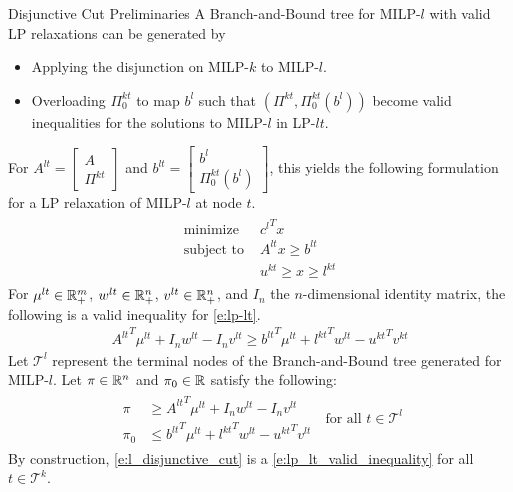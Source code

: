 \documentclass[final]{beamer}
\newlength{\colwidth}
\begin{document}
\begin{frame}[t]
\begin{columns}[t]
\begin{column}{\colwidth}
\begin{block}{Disjunctive Cut Preliminaries}
	A Branch-and-Bound tree for MILP-$ l $ with valid LP relaxations can be generated by
	\begin{itemize}
		\item Applying the disjunction on MILP-$ k $ to MILP-$ l $.
		\item Overloading $ \Pi_0^{kt} $ to map $ b^l $ such that $ (\Pi^{kt}, \Pi_0^{kt}(b^l)) $ become valid inequalities for the solutions to MILP-$ l $ in LP-$ lt $.
	\end{itemize}
	For $ A^{lt} = \begin{bmatrix} A \\ \Pi^{kt} \end{bmatrix} $ and $ b^{lt} = \begin{bmatrix} b^l \\ \Pi_0^{kt}(b^l) \end{bmatrix} $, this yields the following formulation for a LP relaxation of MILP-$ l $ at node $ t $.
	\begin{align}
		\begin{split}
			\text{minimize } & {c^l}^T x \\
			\text{subject to } & A^{lt}x \geq b^{lt} \\
			& u^{kt} \geq x \geq l^{kt}
		\end{split} \label{e:lp-lt} \tag{LP-$ lt $}
	\end{align}
	For $ \mu^{lt} \in \mathbb{R}_+^{m}$, $ w^{lt} \in \mathbb{R}_+^{n}$, $ v^{lt} \in \mathbb{R}_+^{n} $, and $ I_n $ the $ n $-dimensional identity matrix, the following is a valid inequality for \ref{e:lp-lt}.
	\begin{align}
		{A^{lt}}^T \mu^{lt} + I_n w^{lt} - I_n v^{lt} \geq {b^{lt}}^T \mu^{lt} + {l^{kt}}^T w^{lt} - {u^{kt}}^T v^{kt} \label{e:lp_lt_valid_inequality} \tag{LP-$ lt $ valid inequality}
	\end{align}
	Let $ \mathcal{T}^l $ represent the terminal nodes of the Branch-and-Bound tree generated for MILP-$ l $. Let $ \pi \in \mathbb{R}^n $ and $ \pi_0 \in \mathbb{R} $ satisfy the following:
	\begin{align}
		\begin{split}
			\pi &\geq {A^{lt}}^T \mu^{lt} + I_n w^{lt} - I_n v^{lt} \\
			\pi_0 & \leq {b^{lt}}^T \mu^{lt} + {l^{kt}}^T w^{lt} - {u^{kt}}^T v^{lt}
		\end{split} \; \text{ for all } t \in \mathcal{T}^l \label{e:l_disjunctive_cut} \tag{$ l $-disjuctive cut}
	\end{align}
	By construction, \ref{e:l_disjunctive_cut} is a \ref{e:lp_lt_valid_inequality} for all $ t \in \mathcal{T}^k $.
	

\end{block}
\end{column}
\end{columns}
\end{frame}
\end{document}
